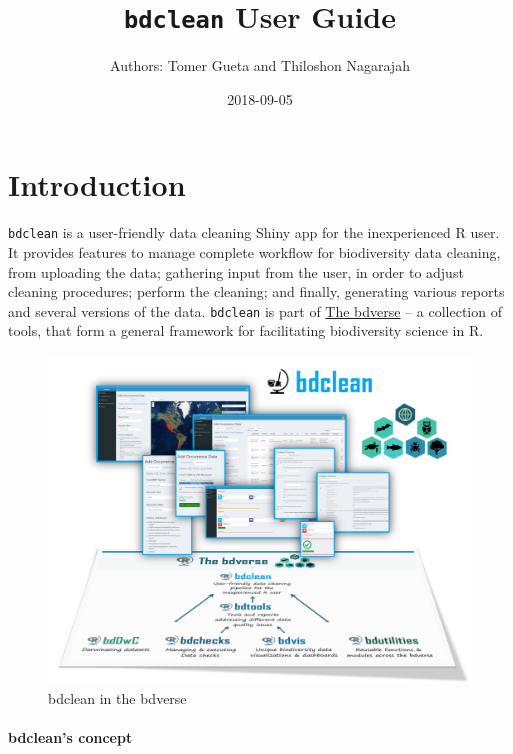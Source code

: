 \documentclass[]{book}
\title{\texttt{bdclean} User Guide}
\author{Authors: Tomer Gueta and Thiloshon Nagarajah}
\date{2018-09-05}
\begin{document}
\maketitle

{
\setcounter{tocdepth}{1}
\tableofcontents
}
\chapter*{Introduction}\label{introduction}

\texttt{bdclean} is a user-friendly data cleaning Shiny app for the
inexperienced R user. It provides features to manage complete workflow
for biodiversity data cleaning, from uploading the data; gathering input
from the user, in order to adjust cleaning procedures; perform the
cleaning; and finally, generating various reports and several versions
of the data. \texttt{bdclean} is part of
\href{https://bd-r.github.io/The-bdverse/index.html}{The bdverse} -- a
collection of tools, that form a general framework for facilitating
biodiversity science in R.

\begin{figure}
\centering
\includegraphics{img/bdclean_bdverse.png}
\caption{bdclean in the bdverse}
\end{figure}

\subsubsection*{bdclean's concept}\label{bdcleans-concept}
\end{document}
